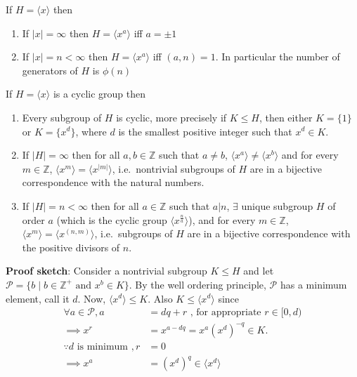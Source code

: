 \documentclass[titlepage, 12pt]{article}
\begin{document}
\begin{proposition}{}{}
    If $H = \langle x\rangle$ then
        \begin{enumerate}
            \item If $|x| = \infty$ then $H = \langle x^a\rangle$ iff $a =
                \pm 1$
            \item If $|x| = n < \infty$ then $H = \langle x^a\rangle$ iff $(a, n) =
                1$. In particular the number of generators of $H$ is $\phi(n)$
        \end{enumerate}
\end{proposition}
\begin{proposition}{}{}
    If $H = \langle x\rangle$ is a cyclic group then
        \begin{enumerate}
            \item Every subgroup of $H$ is cyclic, more precisely if $K\le H$,
                then either $K = \{1\}$ or $K = \{x^d\}$, where $d$ is the
                smallest positive integer such that $x^d\in K$.
            \item If $|H| = \infty$ then for all $a, b\in\mathbb{Z}$ such that
                $a\neq b$, $\langle x^a\rangle\neq\langle x^b\rangle$ and for
                every $m\in\mathbb{Z}$, $\langle x^m\rangle = \langle
                x^{|m|}\rangle$, i.e.\ nontrivial subgroups of $H$ are in a
                bijective correspondence with the natural numbers.
            \item If $|H| = n < \infty$ then for all $a\in\mathbb{Z}$ such that
                $a|n$, $\exists$ unique subgroup $H$ of order $a$ (which is the
                cyclic group $\langle x^{\frac{n}{a}}\rangle$), and for every
                $m\in\mathbb{Z}$, $\langle x^m\rangle = \langle x^{(n,
                m)}\rangle$, i.e.\ subgroups of $H$ are in a bijective
                correspondence with the positive divisors of $n$.
        \end{enumerate}
\end{proposition}
\textbf{Proof sketch}: Consider a nontrivial subgroup $K\leq H$ and let\newline
$\mathcal{P} = \{b\;|\;b\in\mathbb{Z^+}\textrm{ and } x^b\in K\}$. By the well
ordering principle, $\mathcal{P}$ has a minimum element, call it $d$. Now,
$\langle x^d\rangle\leq K$. Also $K\leq\langle x^d\rangle$ since
\begin{align*}
    \forall a\in\mathcal{P}, a &= dq+r\textrm{ , for appropriate $r\in [0, d)$}\\
    \implies x^r &= x^{a-dq} = x^a (x^d)^{-q}\in K.\\
    \because d\textrm{ is minimum }, r &= 0\\
    \implies x^a &= (x^d)^q \in \langle x^d\rangle
\end{align*}
\end{document}

